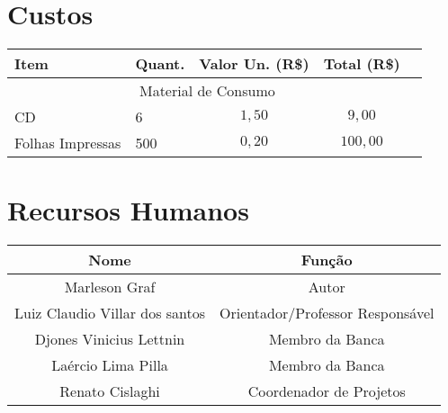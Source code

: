 \documentclass{ufsc-thesis} %
\begin{document}
\chapter{Custos}
\vspace{-.1cm}
\begin{tabular}{|X p{3cm}|c|c|c|}
	\hline
	{\cellcolor{shadecolor}} Item & {\cellcolor{shadecolor}} Quant. & {\cellcolor{shadecolor}} Valor Un. (R\$) & {\cellcolor{shadecolor}} Total (R\$) \\ \hline
	\hline
	\multicolumn{4}{|c|}{Material de Consumo} \\ \hline
	CD & 6 & $1,50$ & $9,00$ \\ \hline
	Folhas Impressas & 500 & $0,20$ & $100,00$ \\ \hline

\end{tabular}

\chapter{Recursos Humanos}

\begin{tabular}{|c|c|}
	\arrayrulecolor{white}
	\hline
	\arrayrulecolor{black}
	\hline
	\rowcolor{shadecolor}
	Nome & Função \\ \hline
	Marleson Graf & Autor \\ \hline
	Luiz Claudio Villar dos santos & Orientador/Professor Responsável \\ \hline
	Djones Vinicius Lettnin & Membro da Banca \\ \hline
	Laércio Lima Pilla & Membro da Banca \\ \hline
	Renato Cislaghi & Coordenador de Projetos \\ \hline

\end{tabular}
\end{document}
